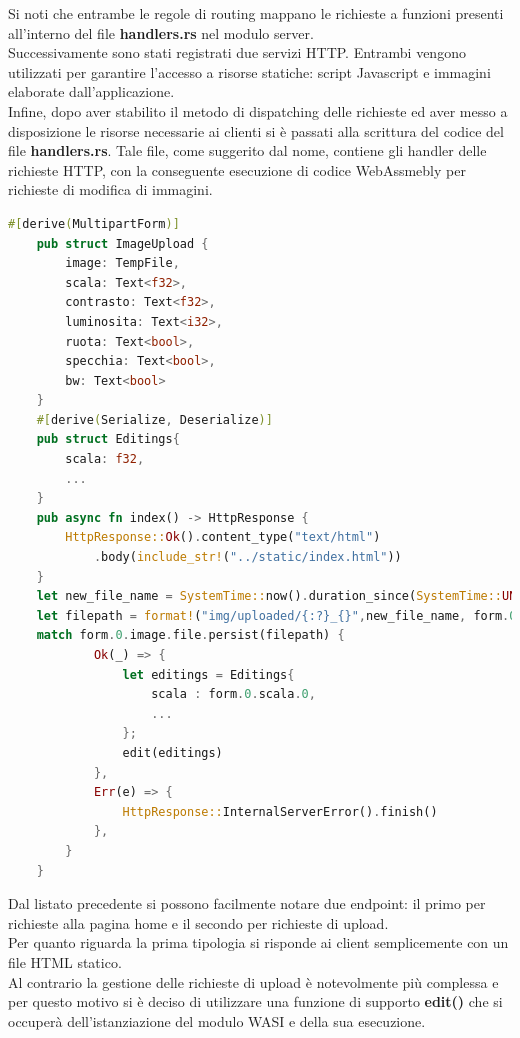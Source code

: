 Si noti che entrambe le regole di routing mappano le richieste a funzioni presenti all'interno del file \textbf{handlers.rs} nel modulo server.
\\Successivamente sono stati registrati due servizi HTTP. Entrambi vengono utilizzati per garantire l'accesso a risorse statiche: script Javascript e immagini elaborate dall'applicazione.
\\Infine, dopo aver stabilito il metodo di dispatching delle richieste ed aver messo a disposizione le risorse necessarie ai clienti si è passati alla scrittura del codice del file \textbf{handlers.rs}. Tale file, come suggerito dal nome, contiene gli handler delle richieste HTTP, con la conseguente esecuzione di codice WebAssmebly per richieste di modifica di immagini.

\begin{lstlisting}[language=Rust,caption={Operazioni principali presenti nel file main.rs}, showstringspaces=false]
    #[derive(MultipartForm)]
    pub struct ImageUpload {
        image: TempFile,
        scala: Text<f32>,
        contrasto: Text<f32>,
        luminosita: Text<i32>,
        ruota: Text<bool>,
        specchia: Text<bool>,
        bw: Text<bool>
    }
    #[derive(Serialize, Deserialize)]
    pub struct Editings{
        scala: f32,
        ...
    }
    pub async fn index() -> HttpResponse {
        HttpResponse::Ok().content_type("text/html")
            .body(include_str!("../static/index.html"))
    }
    let new_file_name = SystemTime::now().duration_since(SystemTime::UNIX_EPOCH).unwrap();
    let filepath = format!("img/uploaded/{:?}_{}",new_file_name, form.0.file_name.as_str());
    match form.0.image.file.persist(filepath) {
            Ok(_) => {
                let editings = Editings{
                    scala : form.0.scala.0,
                    ...
                };
                edit(editings)
            },
            Err(e) => {
                HttpResponse::InternalServerError().finish()
            },
        }
    }
\end{lstlisting}
Dal listato precedente si possono facilmente notare due endpoint: il primo per richieste alla pagina home e il secondo per richieste di upload.
\\Per quanto riguarda la prima tipologia si risponde ai client semplicemente con un file HTML statico.
\\Al contrario la gestione delle richieste di upload è notevolmente più complessa e per questo motivo si è deciso di utilizzare una funzione di supporto \textbf{edit()} che si occuperà dell'istanziazione del modulo WASI e della sua esecuzione.
